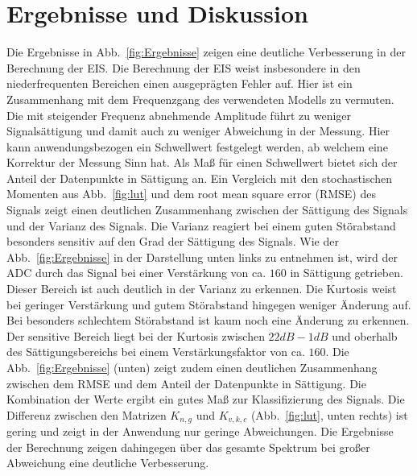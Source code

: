 \section{Ergebnisse und Diskussion}
Die Ergebnisse in Abb.~\ref{fig:Ergebnisse} zeigen eine deutliche Verbesserung in der Berechnung der EIS.
Die Berechnung der EIS weist insbesondere in den niederfrequenten Bereichen einen ausgeprägten Fehler auf. Hier ist ein Zusammenhang mit dem Frequenzgang des verwendeten Modells zu vermuten. Die mit steigender Frequenz abnehmende Amplitude führt zu weniger Signalsättigung und damit auch zu weniger Abweichung in der Messung. Hier kann anwendungsbezogen ein Schwellwert festgelegt werden, ab welchem eine Korrektur der Messung Sinn hat. Als Maß für einen Schwellwert bietet sich der Anteil der Datenpunkte in Sättigung an. Ein Vergleich mit den stochastischen Momenten aus Abb.~\ref{fig:lut} und dem root mean square error (RMSE) des Signals zeigt einen deutlichen Zusammenhang zwischen der Sättigung des Signals und der Varianz des Signals. Die Varianz reagiert bei einem guten Störabstand besonders sensitiv auf den Grad der Sättigung des Signals. Wie der Abb.~\ref{fig:Ergebnisse} in der Darstellung unten links zu entnehmen ist, wird der ADC durch das Signal bei einer Verstärkung von ca. $160$ in Sättigung getrieben. Dieser Bereich ist auch deutlich in der Varianz zu erkennen. Die Kurtosis weist bei geringer Verstärkung und gutem Störabstand hingegen weniger Änderung auf. Bei besonders schlechtem Störabstand ist kaum noch eine Änderung zu erkennen. Der sensitive Bereich liegt bei der Kurtosis zwischen $22dB - 1dB$ und oberhalb des Sättigungsbereichs bei einem Verstärkungsfaktor von ca. $160$. Die Abb.~\ref{fig:Ergebnisse} (unten) zeigt zudem einen deutlichen Zusammenhang zwischen dem RMSE und dem Anteil der Datenpunkte in Sättigung. Die Kombination der Werte ergibt ein gutes Maß zur Klassifizierung des Signals. Die Differenz zwischen den Matrizen $K_{n,g}$ und $K_{v,k,c}$ (Abb.~\ref{fig:lut}, unten rechts) ist gering und zeigt in der Anwendung nur geringe Abweichungen. Die Ergebnisse der Berechnung zeigen dahingegen über das gesamte Spektrum bei großer Abweichung eine deutliche Verbesserung. 
